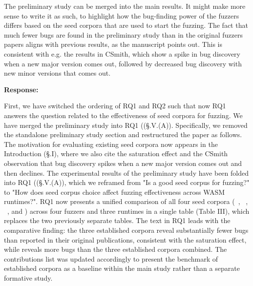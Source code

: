\documentclass[11pt]{article}
\newenvironment{response}{%
    \par\vspace{10pt}
    \par\noindent\textbf{\color{tseblue}Response:}\par\nobreak\ignorespaces
}{%
    \par\vspace{15pt}
}
\newcounter{reviewernum}
\newcounter{cmtcounter}[reviewernum]
\newenvironment{rcomment}{%
    \stepcounter{cmtcounter}%
    \begin{revcomment}[R\thereviewernum{}.C\thecmtcounter{}.~Reviewer~\thereviewernum{}, Comment~\thecmtcounter]
}{%
    \end{revcomment}
}
\begin{document}
\begin{rcomment}
    The preliminary study can be merged into the main results. It might make more sense to write it as such, to highlight how the bug-finding power of the fuzzers differs based on the seed corpora that are used to start the fuzzing. The fact that much fewer bugs are found in the preliminary study than in the original fuzzers papers aligns with previous results, as the manuscript points out. This is consistent with e.g. the results in CSmith, which show a spike in bug discovery when a new major version comes out, followed by decreased bug discovery with new minor versions that comes out.
\end{rcomment}
\begin{response}
    First, we have switched the ordering of RQ1 and RQ2 such that now RQ1 answers the question related to the effectiveness of seed corpora for fuzzing. We have merged the preliminary study into RQ1 ((§.V.(A)). Specifically, we removed the standalone preliminary study section and restructured the paper as follows. The motivation for evaluating existing seed corpora now appears in the Introduction (§.I), where we also cite the saturation effect and the CSmith observation that bug discovery spikes when a new major version comes out and then declines. The experimental results of the preliminary study have been folded into RQ1 ((§.V.(A)), which we reframed from "Is \rtbench{} a good seed corpus for fuzzing?" to "How does seed corpus choice affect fuzzing effectiveness across WASM runtimes?". RQ1 now presents a unified comparison of all four seed corpora (\llvmbench{}~\cite{zhao2024wapplique}, \wasmbench{}~\cite{hilbig2021empirical}, \specbench{}~\cite{zhou2023wadiff}, and \rtbench{}) across four fuzzers and three runtimes in a single table (Table III), which replaces the two previously separate tables. The text in RQ1 leads with the comparative finding: the three established corpora reveal substantially fewer bugs than reported in their original publications, consistent with the saturation effect, while \rtbench{} reveals more bugs than the three established corpora combined. The contributions list was updated accordingly to present the benchmark of established corpora as a baseline within the main study rather than a separate formative study.
\end{response}
\end{document}
